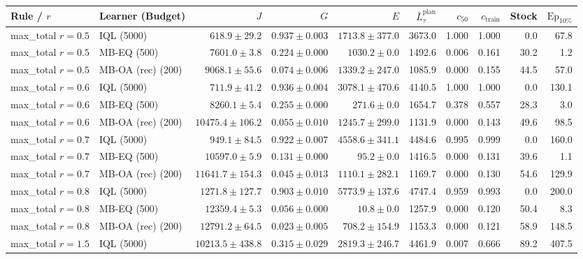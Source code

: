 \begin{tabular}{llrrrrrrrr}
\toprule
Rule / $r$ & Learner (Budget) & $J$ & $G$ & $E$ & $\bar{L}_{\tau}^{\text{plan}}$ & $c_{50}$ & $c_{\text{train}}$ & Stock & $\text{Ep}_{10\%}$ \\
\midrule
max\_total $r=0.5$ & IQL (5000) & $618.9 \pm 29.2$ & $0.937 \pm 0.003$ & $1713.8 \pm 377.0$ & 3673.0 & 1.000 & 1.000 & 0.0 & 67.8 \\
max\_total $r=0.5$ & MB-EQ (500) & $7601.0 \pm 3.8$ & $0.224 \pm 0.000$ & $1030.2 \pm 0.0$ & 1492.6 & 0.006 & 0.161 & 30.2 & 1.2 \\
max\_total $r=0.5$ & MB-OA (rec) (200) & $\mathbf{9068.1 \pm 55.6}$ & $\mathbf{0.074 \pm 0.006}$ & $1339.2 \pm 247.0$ & 1085.9 & 0.000 & 0.155 & 44.5 & 57.0 \\
max\_total $r=0.6$ & IQL (5000) & $711.9 \pm 41.2$ & $0.936 \pm 0.004$ & $3078.1 \pm 470.6$ & 4140.5 & 1.000 & 1.000 & 0.0 & 130.1 \\
max\_total $r=0.6$ & MB-EQ (500) & $8260.1 \pm 5.4$ & $0.255 \pm 0.000$ & $271.6 \pm 0.0$ & 1654.7 & 0.378 & 0.557 & 28.3 & 3.0 \\
max\_total $r=0.6$ & MB-OA (rec) (200) & $\mathbf{10475.4 \pm 106.2}$ & $\mathbf{0.055 \pm 0.010}$ & $1245.7 \pm 299.0$ & 1131.9 & 0.000 & 0.143 & 49.6 & 98.5 \\
max\_total $r=0.7$ & IQL (5000) & $949.1 \pm 84.5$ & $0.922 \pm 0.007$ & $4558.6 \pm 341.1$ & 4484.6 & 0.995 & 0.999 & 0.0 & 160.0 \\
max\_total $r=0.7$ & MB-EQ (500) & $10597.0 \pm 5.9$ & $0.131 \pm 0.000$ & $95.2 \pm 0.0$ & 1416.5 & 0.000 & 0.131 & 39.6 & 1.1 \\
max\_total $r=0.7$ & MB-OA (rec) (200) & $\mathbf{11641.7 \pm 154.3}$ & $\mathbf{0.045 \pm 0.013}$ & $1110.1 \pm 282.1$ & 1169.7 & 0.000 & 0.130 & 54.6 & 129.9 \\
max\_total $r=0.8$ & IQL (5000) & $1271.8 \pm 127.7$ & $0.903 \pm 0.010$ & $5773.9 \pm 137.6$ & 4747.4 & 0.959 & 0.993 & 0.0 & 200.0 \\
max\_total $r=0.8$ & MB-EQ (500) & $12359.4 \pm 5.3$ & $0.056 \pm 0.000$ & $10.8 \pm 0.0$ & 1257.9 & 0.000 & 0.120 & 50.4 & 8.3 \\
max\_total $r=0.8$ & MB-OA (rec) (200) & $\mathbf{12791.2 \pm 64.5}$ & $\mathbf{0.023 \pm 0.005}$ & $708.2 \pm 154.9$ & 1153.3 & 0.000 & 0.121 & 58.9 & 148.5 \\
max\_total $r=1.5$ & IQL (5000) & $10213.5 \pm 438.8$ & $0.315 \pm 0.029$ & $2819.3 \pm 246.7$ & 4461.9 & 0.007 & 0.666 & 89.2 & 407.5 \\

\end{tabular}
